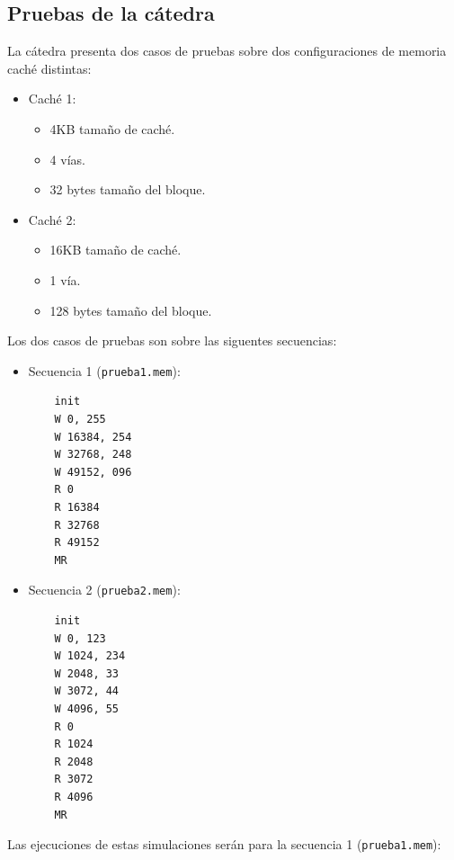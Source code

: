 \documentclass[titlepage,a4paper]{article}
\begin{document}
\subsection{Pruebas de la cátedra}

La cátedra presenta dos casos de pruebas sobre dos configuraciones de memoria caché distintas:
\begin{itemize}
    \item Caché 1:
    \begin{itemize}
        \item 4KB tamaño de caché.
        \item 4 vías.
        \item 32 bytes tamaño del bloque.
    \end{itemize}
    \item Caché 2:
    \begin{itemize}
        \item 16KB tamaño de caché.
        \item 1 vía.
        \item 128 bytes tamaño del bloque.
    \end{itemize}
\end{itemize}

Los dos casos de pruebas son sobre las siguentes secuencias:

\begin{itemize}
    \item Secuencia 1 (\verb|prueba1.mem|):
    \begin{verbatim}
    init
    W 0, 255
    W 16384, 254
    W 32768, 248
    W 49152, 096
    R 0
    R 16384
    R 32768
    R 49152
    MR
    \end{verbatim}
    \item Secuencia 2 (\verb|prueba2.mem|):
    \begin{verbatim}
    init
    W 0, 123
    W 1024, 234
    W 2048, 33
    W 3072, 44
    W 4096, 55
    R 0
    R 1024
    R 2048
    R 3072
    R 4096
    MR
    \end{verbatim}
\end{itemize}

Las ejecuciones de estas simulaciones serán para la secuencia 1 (\verb|prueba1.mem|):
\end{document}
